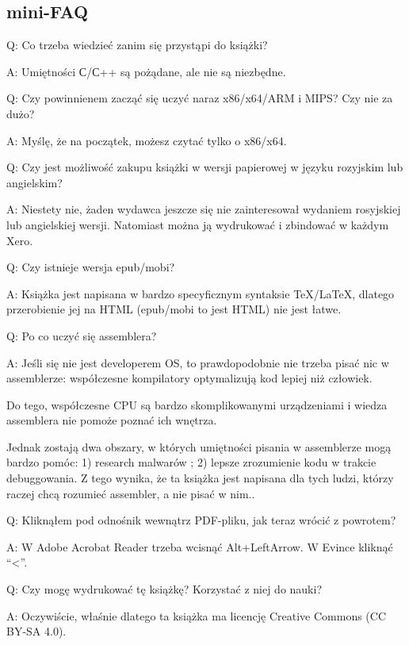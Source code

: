 \subsection*{mini-FAQ}

\par Q: Co trzeba wiedzieć zanim się przystąpi do książki?
\par A: Umiętności С/С++ są pożądane, ale nie są niezbędne.

\par Q: Czy powinnienem zacząć się uczyć naraz x86/x64/ARM i MIPS? Czy nie za dużo?
\par A: Myślę, że na początek, możesz czytać tylko o x86/x64.

\par Q: Czy jest możliwość zakupu książki w wersji papierowej w języku rozyjskim lub angielskim?
\par A: Niestety nie, żaden wydawca jeszcze się nie zainteresował wydaniem rosyjskiej lub angielskiej wersji. Natomiast można ją wydrukować i zbindować w każdym Xero.

\par Q: Czy istnieje wersja epub/mobi?
\par A: Książka jest napisana w bardzo specyficznym syntaksie TeX/LaTeX, dlatego przerobienie jej na HTML (epub/mobi to jest HTML)
nie jest łatwe.

\par Q: Po co uczyć się assemblera?
\par A: Jeśli się nie jest developerem \ac{OS}, to prawdopodobnie nie trzeba pisać nic w assemblerze: współczesne kompilatory optymalizują kod lepiej niż człowiek.

Do tego, współczesne \ac{CPU} są bardzo skomplikowanymi urządzeniami i wiedza assemblera nie pomoże poznać ich wnętrza.

Jednak zostają dwa obszary, w których umiętności pisania w assemblerze mogą bardzo pomóc:
1) research malwarów ; 2) lepsze zrozumienie kodu w trakcie debuggowania.
Z tego wynika, że ta książka jest napisana dla tych ludzi, którzy raczej chcą rozumieć assembler, a nie pisać w nim..

\par Q: Kliknąłem pod odnośnik wewnątrz PDF-pliku, jak teraz wrócić z powrotem?
\par A: W Adobe Acrobat Reader trzeba wcisnąć Alt+LeftArrow. W Evince kliknąć ``<''.

\par Q: Czy mogę wydrukować tę książkę? Korzystać z niej do nauki?
\par A: Oczywiście, właśnie dlatego ta książka ma licencję Creative Commons (CC BY-SA 4.0).

